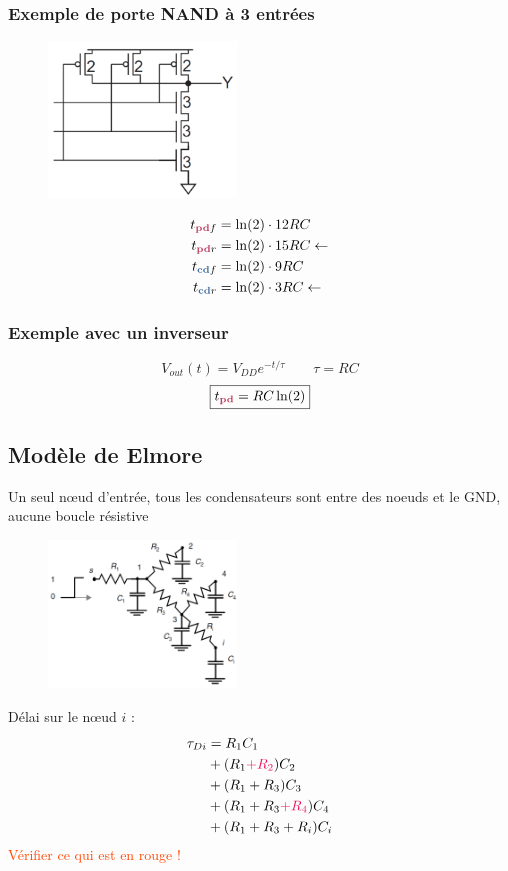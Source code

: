 \documentclass[resume]{subfiles}
\begin{document}
\begin{multicols}{3}
\subsubsection{Exemple de porte NAND à 3 entrées}
\begin{figure}[H]
\centering
\includegraphics[width=5cm]{img_42.png}
\end{figure}
\begin{align*}
t_{\pdelay f}&=\ln(2)\cdot 12RC\\
t_{\pdelay r}&=\ln(2)\cdot 15RC\leftarrow\\
t_{\cdelay f}&=\ln(2)\cdot 9RC\\
t_{\cdelay r}&=\ln(2)\cdot 3RC\leftarrow
\end{align*}

\subsubsection{Exemple avec un inverseur}
$$V_{out}(t)=V_{DD}e^{-t/\tau}\qquad \tau=RC$$
$$\boxed{t_{\pdelay}=RC\ln(2)}$$
\subsection{Modèle de Elmore}
Un seul nœud d'entrée, tous les condensateurs sont entre des noeuds et le GND, aucune boucle résistive
\begin{figure}[H]
\centering
\includegraphics[width=5.00cm]{img_43.png}
\end{figure}
Délai sur le nœud $i$ :
\begin{align*}
\tau_{Di}&=R_1C_1\\&+(R_1\textcolor{OrangeRed}{+R_2})C_2\\&+(R_1+R_3)C_3\\&+(R_1+R_3\textcolor{OrangeRed}{+R_4})C_4\\&+(R_1+R_3+R_i)C_i
\end{align*}
\textcolor{OrangeRed}{Vérifier ce qui est en rouge !}

\end{multicols}
\end{document}

